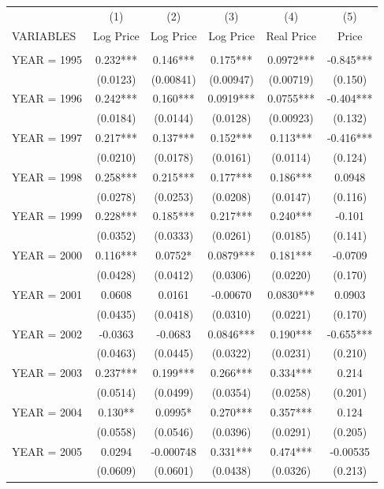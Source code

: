 \begin{tabular}{lccccc} \hline
 & (1) & (2) & (3) & (4) & (5) \\
VARIABLES & Log Price & Log Price & Log Price & Real Price & Price \\ \hline
 &  &  &  &  &  \\
YEAR = 1995 & 0.232*** & 0.146*** & 0.175*** & 0.0972*** & -0.845*** \\
 & (0.0123) & (0.00841) & (0.00947) & (0.00719) & (0.150) \\
YEAR = 1996 & 0.242*** & 0.160*** & 0.0919*** & 0.0755*** & -0.404*** \\
 & (0.0184) & (0.0144) & (0.0128) & (0.00923) & (0.132) \\
YEAR = 1997 & 0.217*** & 0.137*** & 0.152*** & 0.113*** & -0.416*** \\
 & (0.0210) & (0.0178) & (0.0161) & (0.0114) & (0.124) \\
YEAR = 1998 & 0.258*** & 0.215*** & 0.177*** & 0.186*** & 0.0948 \\
 & (0.0278) & (0.0253) & (0.0208) & (0.0147) & (0.116) \\
YEAR = 1999 & 0.228*** & 0.185*** & 0.217*** & 0.240*** & -0.101 \\
 & (0.0352) & (0.0333) & (0.0261) & (0.0185) & (0.141) \\
YEAR = 2000 & 0.116*** & 0.0752* & 0.0879*** & 0.181*** & -0.0709 \\
 & (0.0428) & (0.0412) & (0.0306) & (0.0220) & (0.170) \\
YEAR = 2001 & 0.0608 & 0.0161 & -0.00670 & 0.0830*** & 0.0903 \\
 & (0.0435) & (0.0418) & (0.0310) & (0.0221) & (0.170) \\
YEAR = 2002 & -0.0363 & -0.0683 & 0.0846*** & 0.190*** & -0.655*** \\
 & (0.0463) & (0.0445) & (0.0322) & (0.0231) & (0.210) \\
YEAR = 2003 & 0.237*** & 0.199*** & 0.266*** & 0.334*** & 0.214 \\
 & (0.0514) & (0.0499) & (0.0354) & (0.0258) & (0.201) \\
YEAR = 2004 & 0.130** & 0.0995* & 0.270*** & 0.357*** & 0.124 \\
 & (0.0558) & (0.0546) & (0.0396) & (0.0291) & (0.205) \\
YEAR = 2005 & 0.0294 & -0.000748 & 0.331*** & 0.474*** & -0.00535 \\
 & (0.0609) & (0.0601) & (0.0438) & (0.0326) & (0.213) \\

\end{tabular}
